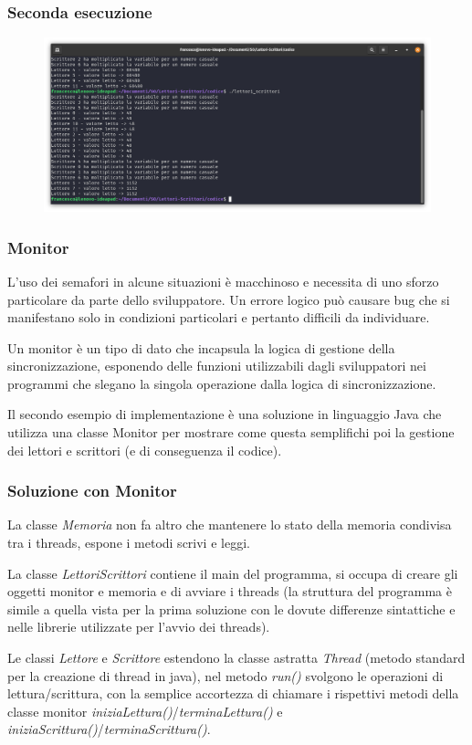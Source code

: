 \documentclass[10pt]{beamer}
\begin{document}
	\begin{frame}[fragile]
		\frametitle{Seconda esecuzione}
		\begin{figure}
			\centering
			\includegraphics[width=1.03\linewidth]{img/esecuzione/programC2}
			\label{fig:programc1}
		\end{figure}
	\end{frame}


\begin{frame}
	\frametitle{Monitor}
	L'uso dei semafori in alcune situazioni è macchinoso e necessita di uno sforzo particolare da parte dello sviluppatore. Un errore logico può causare bug che si manifestano solo in condizioni particolari e pertanto difficili da individuare.
	
	Un monitor è un tipo di dato che incapsula la logica di gestione della sincronizzazione, esponendo delle funzioni utilizzabili dagli sviluppatori nei programmi che slegano la singola operazione dalla logica di sincronizzazione.
	
	Il secondo esempio di implementazione è una soluzione in linguaggio Java che utilizza una classe Monitor per mostrare come questa semplifichi poi la gestione dei lettori e scrittori (e di conseguenza il codice).
\end{frame}

\begin{frame}
	\frametitle{Soluzione con Monitor}
	La classe \emph{Memoria} non fa altro che mantenere lo stato della memoria condivisa tra i threads, espone i metodi scrivi e leggi.
	
	La classe \emph{LettoriScrittori} contiene il main del programma, si occupa di creare gli oggetti monitor e memoria e di avviare i threads (la struttura del programma è simile a quella vista per la prima soluzione con le dovute differenze sintattiche e nelle librerie utilizzate per l'avvio dei threads).
	
	Le classi \emph{Lettore} e \emph{Scrittore} estendono la classe astratta \emph{Thread} (metodo standard per la creazione di thread in java), nel metodo \emph{run()} svolgono le operazioni di lettura/scrittura, con la semplice accortezza di chiamare i rispettivi metodi della classe monitor \emph{iniziaLettura()}/\emph{terminaLettura()} e \emph{iniziaScrittura()}/\emph{terminaScrittura()}.
\end{frame}
\end{document}
